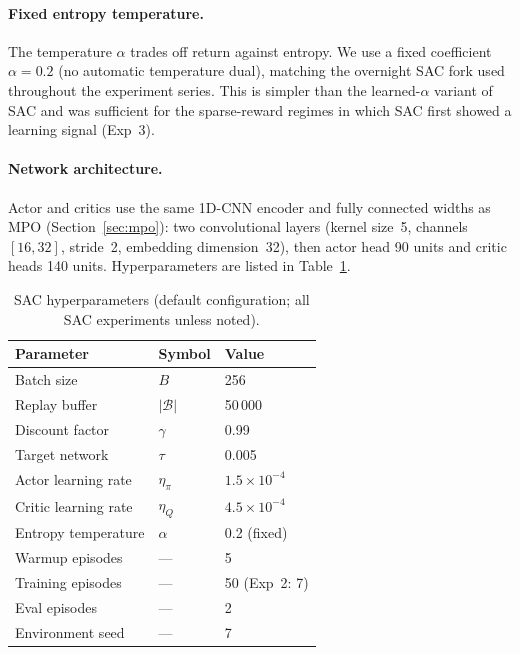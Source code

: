 \paragraph{Fixed entropy temperature.}
The temperature $\alpha$ trades off return against entropy.
We use a fixed coefficient $\alpha=0.2$ (no automatic temperature dual), matching the overnight SAC fork used throughout the experiment series.
This is simpler than the learned-$\alpha$ variant of SAC and was sufficient for the sparse-reward regimes in which SAC first showed a learning signal (Exp~3).

\paragraph{Network architecture.}
Actor and critics use the same 1D-CNN encoder and fully connected widths as MPO (Section~\ref{sec:mpo}): two convolutional layers (kernel size~5, channels $[16,32]$, stride~2, embedding dimension~32), then actor head 90 units and critic heads 140 units.
Hyperparameters are listed in Table~\ref{tab:sac-hparams}.

\begin{table}[htbp]
  \centering
  \caption{SAC hyperparameters (default configuration; all SAC experiments unless noted).}
  \label{tab:sac-hparams}
  \begin{tabular}{lll}
    \toprule
    Parameter & Symbol & Value \\
    \midrule
    Batch size               & $B$               & 256 \\
    Replay buffer            & $|\mathcal{B}|$   & 50\,000 \\
    Discount factor          & $\gamma$          & 0.99 \\
    Target network           & $\tau$            & 0.005 \\
    Actor learning rate      & $\eta_\pi$        & $1.5\times10^{-4}$ \\
    Critic learning rate     & $\eta_Q$          & $4.5\times10^{-4}$ \\
    Entropy temperature      & $\alpha$          & 0.2 (fixed) \\
    Warmup episodes           & ---               & 5 \\
    Training episodes         & ---               & 50 (Exp~2: 7) \\
    Eval episodes             & ---               & 2 \\
    Environment seed          & ---               & 7 \\
    \bottomrule
  \end{tabular}
\end{table}

